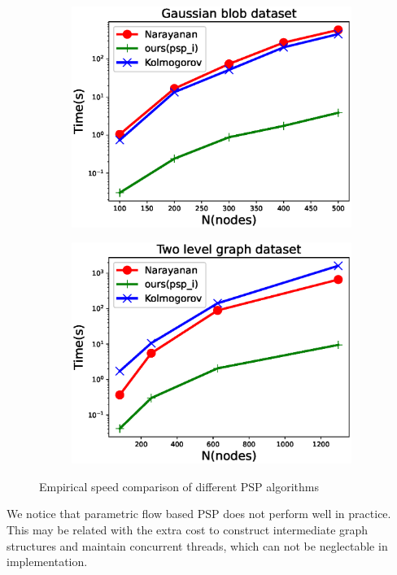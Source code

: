 \begin{figure}
	\centering
	\begin{subfigure}{0.45\textwidth}
		\includegraphics[width=\textwidth]{pic/2019-08-26-gaussian.eps}
	\end{subfigure}
	\begin{subfigure}{0.45\textwidth}
		\includegraphics[width=\textwidth]{pic/2019-09-19-two_level.eps}
	\end{subfigure}
	\caption{Empirical speed comparison of different PSP algorithms}\label{fig:esc}
\end{figure}

We notice that parametric flow based PSP  \citep{kolmogorov}  does not perform well in practice. This may be related with the extra cost to construct intermediate graph structures and maintain concurrent threads, which can not be neglectable in implementation.

